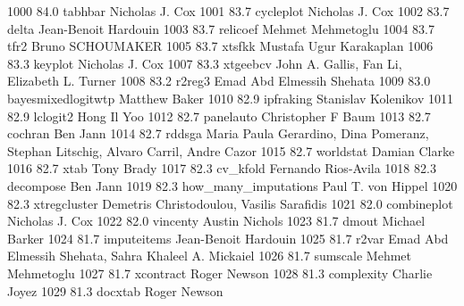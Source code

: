   1000     84.0    tabhbar       Nicholas J. Cox                         
  1001     83.7    cycleplot     Nicholas J. Cox                         
  1002     83.7    delta         Jean-Benoit Hardouin                    
  1003     83.7    relicoef      Mehmet Mehmetoglu                       
  1004     83.7    tfr2          Bruno SCHOUMAKER                        
  1005     83.7    xtsfkk        Mustafa Ugur Karakaplan                 
  1006     83.3    keyplot       Nicholas J. Cox                         
  1007     83.3    xtgeebcv      John A. Gallis, Fan Li, Elizabeth L.    
                                   Turner                                  
  1008     83.2    r2reg3        Emad Abd Elmessih Shehata               
  1009     83.0    bayesmixedlogitwtp  Matthew Baker                           
  1010     82.9    ipfraking     Stanislav Kolenikov                     
  1011     82.9    lclogit2      Hong Il Yoo                             
  1012     82.7    panelauto     Christopher F Baum                      
  1013     82.7    cochran       Ben Jann                                
  1014     82.7    rddsga        Maria Paula Gerardino, Dina Pomeranz,   
                                   Stephan Litschig, Alvaro Carril, Andre  
                                   Cazor                                   
  1015     82.7    worldstat     Damian Clarke                           
  1016     82.7    xtab          Tony Brady                              
  1017     82.3    cv_kfold      Fernando Rios-Avila                     
  1018     82.3    decompose     Ben Jann                                
  1019     82.3    how_many_imputations  Paul T. von Hippel                      
  1020     82.3    xtregcluster  Demetris Christodoulou, Vasilis         
                                   Sarafidis                               
  1021     82.0    combineplot   Nicholas J. Cox                         
  1022     82.0    vincenty      Austin Nichols                          
  1023     81.7    dmout         Michael Barker                          
  1024     81.7    imputeitems   Jean-Benoit Hardouin                    
  1025     81.7    r2var         Emad Abd Elmessih Shehata, Sahra        
                                   Khaleel A. Mickaiel                     
  1026     81.7    sumscale      Mehmet Mehmetoglu                       
  1027     81.7    xcontract     Roger Newson                            
  1028     81.3    complexity    Charlie Joyez                           
  1029     81.3    docxtab       Roger Newson                            
